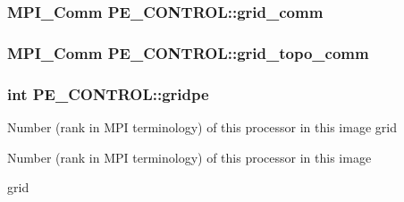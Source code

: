 \hypertarget{struct_p_e___c_o_n_t_r_o_l_a7416f0554346c4b563fb2d4d742b9d4f}{
\subsubsection[{grid\-\_\-comm}]{\setlength{\rightskip}{0pt plus 5cm}M\-P\-I\-\_\-\-Comm P\-E\-\_\-\-C\-O\-N\-T\-R\-O\-L\-::grid\-\_\-comm}}\label{struct_p_e___c_o_n_t_r_o_l_a7416f0554346c4b563fb2d4d742b9d4f}
\hypertarget{struct_p_e___c_o_n_t_r_o_l_a1af3538d0763d83ea0826f775cb9bf74}{
\subsubsection[{grid\-\_\-topo\-\_\-comm}]{\setlength{\rightskip}{0pt plus 5cm}M\-P\-I\-\_\-\-Comm P\-E\-\_\-\-C\-O\-N\-T\-R\-O\-L\-::grid\-\_\-topo\-\_\-comm}}\label{struct_p_e___c_o_n_t_r_o_l_a1af3538d0763d83ea0826f775cb9bf74}
\hypertarget{struct_p_e___c_o_n_t_r_o_l_a7f4c0f0721be082565236a183b6d13ab}{
\subsubsection[{gridpe}]{\setlength{\rightskip}{0pt plus 5cm}int P\-E\-\_\-\-C\-O\-N\-T\-R\-O\-L\-::gridpe}}\label{struct_p_e___c_o_n_t_r_o_l_a7f4c0f0721be082565236a183b6d13ab}
Number (rank in M\-P\-I terminology) of this processor in this image grid

Number (rank in M\-P\-I terminology) of this processor in this image
\begin{DoxyItemize}
\item grid
\end{DoxyItemize}

